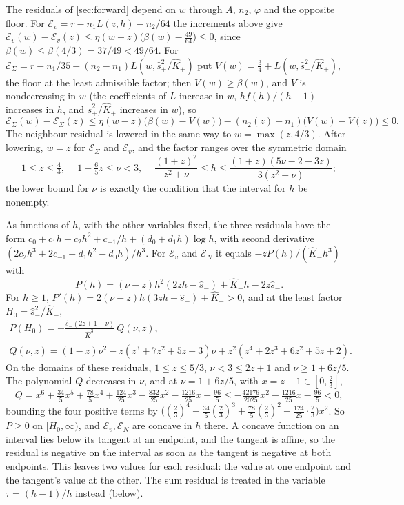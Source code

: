  The residuals of \cref{sec:forward} depend on $w$ through
$A$, $n_2$, $\varphi$ and the opposite floor. For $\mathcal E_v=r-n_1L(z,h)-n_2/64$ the increments
above give
$\mathcal E_v(w)-\mathcal E_v(z)\le\eta(w-z)\bigl(\beta(w)-\frac{49}{64}\bigr)\le0$, since
$\beta(w)\le\beta(4/3)=37/49<49/64$. For
$\mathcal E_\Sigma=r-n_1/35-(n_2-n_1)L(w,\hat s_+^2/\hat K_+)$ put $V(w)=\frac34+L(w,\hat s_+^2/\hat K_+)$,
the floor at the least admissible factor; then $V(w)\ge\beta(w)$, and $V$ is nondecreasing in $w$
(the coefficients of $L$ increase in $w$, $hf(h)/(h-1)$ increases in $h$, and
$\hat s_+^2/\hat K_+$ increases in $w$), so
\[
\mathcal E_\Sigma(w)-\mathcal E_\Sigma(z)
\le\eta(w-z)\bigl(\beta(w)-V(w)\bigr)-(n_2(z)-n_1)\bigl(V(w)-V(z)\bigr)\le0 .
\]
The neighbour residual is lowered in the same way to $w=\max(z,4/3)$. After lowering, $w=z$ for
$\mathcal E_\Sigma$ and $\mathcal E_v$, and the factor ranges over the symmetric domain
\begin{equation}\label{eq:fwd-symdomain}
1\le z\le\tfrac43,\quad\ 1+\tfrac65z\le\nu<3,\quad\
\frac{(1+z)^2}{z^2+\nu}\le h\le\frac{(1+z)(5\nu-2-3z)}{3(z^2+\nu)};
\end{equation}
the lower bound for $\nu$ is exactly the condition that the interval for $h$ be nonempty.

 As functions of $h$, with the other variables fixed, the three
residuals have the form $c_0+c_1h+c_2h^2+c_{-1}/h+(d_0+d_1h)\log h$, with second derivative
$(2c_2h^3+2c_{-1}+d_1h^2-d_0h)/h^3$. For $\mathcal E_v$ and $\mathcal E_N$ it equals
$-zP(h)/(\hat K_-h^3)$ with
\[
P(h)=(\nu-z)h^2(2zh-\hat s_-)+\hat K_-h-2z\hat s_- .
\]
For $h\ge1$, $P'(h)=2(\nu-z)h(3zh-\hat s_-)+\hat K_->0$, and at the least factor
$H_0=\hat s_-^2/\hat K_-$,
\begin{gather*}
P(H_0)=-\frac{\hat s_-(2z+1-\nu)}{\hat K_-^3}\,Q(\nu,z),\\
Q(\nu,z)=(1-z)\nu^2-z(z^3+7z^2+5z+3)\nu+z^2(z^4+2z^3+6z^2+5z+2).
\end{gather*}
On the domains of these residuals, $1\le z\le5/3$, $\nu<3\le2z+1$ and $\nu\ge1+6z/5$. The
polynomial $Q$ decreases in $\nu$, and at $\nu=1+6z/5$, with $x=z-1\in[0,\frac23]$,
\[
Q=x^6+\tfrac{34}5x^5+\tfrac{78}5x^4+\tfrac{124}{25}x^3-\tfrac{832}{25}x^2-\tfrac{1216}{25}x-\tfrac{96}5
\le-\tfrac{42176}{2025}x^2-\tfrac{1216}{25}x-\tfrac{96}5<0,
\]
bounding the four positive terms by
$\bigl((\frac23)^4+\frac{34}5(\frac23)^3+\frac{78}5(\frac23)^2+\frac{124}{25}\cdot\frac23\bigr)x^2$.
So $P\ge0$ on $[H_0,\infty)$, and $\mathcal E_v,\mathcal E_N$ are concave in $h$ there. A concave
function on an interval lies below its tangent at an endpoint, and the tangent is affine, so the
residual is negative on the interval as soon as the tangent is negative at both endpoints. This
leaves two values for each residual: the value at one endpoint and the tangent's value at the
other. The sum residual is treated in the variable $\tau=(h-1)/h$ instead (below).

